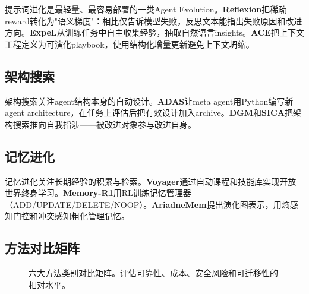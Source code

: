 提示词进化是最轻量、最容易部署的一类Agent Evolution。\textbf{Reflexion}把稀疏reward转化为"语义梯度"：相比仅告诉模型失败，反思文本能指出失败原因和改进方向。\textbf{ExpeL}从训练任务中自主收集经验，抽取自然语言insights。\textbf{ACE}把上下文工程定义为可演化playbook，使用结构化增量更新避免上下文坍缩。

\subsection{架构搜索}\label{sec:arch}

架构搜索关注agent结构本身的自动设计。\textbf{ADAS}让meta agent用Python编写新agent architecture，在任务上评估后把有效设计加入archive。\textbf{DGM}和\textbf{SICA}把架构搜索推向自我指涉——被改进对象参与改进自身。

\subsection{记忆进化}\label{sec:memory}

记忆进化关注长期经验的积累与检索。\textbf{Voyager}通过自动课程和技能库实现开放世界终身学习。\textbf{Memory-R1}用RL训练记忆管理器（ADD/UPDATE/DELETE/NOOP）。\textbf{AriadneMem}提出演化图表示，用熵感知门控和冲突感知粗化管理记忆。

\subsection{方法对比矩阵}\label{sec:method-compare}

\begin{figure}[htbp]
\centering
{}
\caption{六大方法类别对比矩阵。评估可靠性、成本、安全风险和可迁移性的相对水平。}
\label{fig:ch3-method-compare}
\end{figure}
